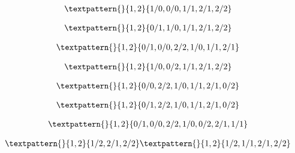 \begin{equation}
	\begin{gathered}
		\textpattern{}{1,2}{1/0,0/0,1/1,2/1,2/2}
	\end{gathered}
	\label{cls:158}
\end{equation}

\begin{equation}
	\begin{gathered}
		\textpattern{}{1,2}{0/1,1/0,1/1,2/1,2/2}
	\end{gathered}
	\label{cls:159}
\end{equation}

\begin{equation}
	\begin{gathered}
		\textpattern{}{1,2}{0/1,0/0,2/2,1/0,1/1,2/1}
	\end{gathered}
	\label{cls:160}
\end{equation}

\begin{equation}
	\begin{gathered}
		\textpattern{}{1,2}{1/0,0/2,1/1,2/1,2/2}
	\end{gathered}
	\label{cls:161}
\end{equation}

\begin{equation}
	\begin{gathered}
		\textpattern{}{1,2}{0/0,2/2,1/0,1/1,2/1,0/2}
	\end{gathered}
	\label{cls:162}
\end{equation}

\begin{equation}
	\begin{gathered}
		\textpattern{}{1,2}{0/1,2/2,1/0,1/1,2/1,0/2}
	\end{gathered}
	\label{cls:163}
\end{equation}

\begin{equation}
	\begin{gathered}
		\textpattern{}{1,2}{0/1,0/0,2/2,1/0,0/2,2/1,1/1}
	\end{gathered}
	\label{cls:164}
\end{equation}

\begin{equation}
	\begin{gathered}
		\textpattern{}{1,2}{1/2,2/1,2/2}
		\textpattern{}{1,2}{1/2,1/1,2/1,2/2}
	\end{gathered}
	\label{cls:165}
\end{equation}

